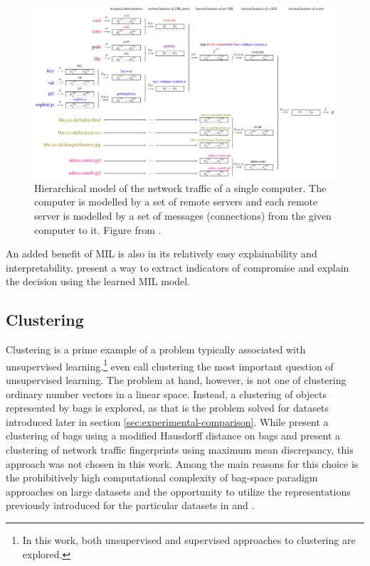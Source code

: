 \begin{figure}
	\centering
	\includegraphics[width=\textwidth]{images/HTTP-paper/HTTP-paper.pdf}
	\caption{Hierarchical model of the network traffic of a single computer. The computer is modelled by a set of remote servers and each remote server is modelled by a set of messages (connections) from the given computer to it. Figure from \cite{pevny_nested_2020}.}\label{fig:HTTP-paper}
\end{figure}

An added benefit of MIL is also in its relatively easy explainability and interpretability. \cite{pevny_nested_2020} present a way to extract indicators of compromise and explain the decision using the learned MIL model.

\subsection{Clustering}

Clustering is a prime example of a problem typically associated with unsupervised learning.\footnote{In this work, both unsupervised and supervised approaches to clustering are explored.} \cite{xu_comprehensive_2015} even call clustering the most important question of unsupervised learning. The problem at hand, however, is not one of clustering ordinary number vectors in a linear space. Instead, a clustering of objects represented by bags is explored, as that is the problem solved for datasets introduced later in section \ref{sec:experimental-comparison}. While \cite{wang_solving_2000} present a clustering of bags using a modified Hausdorff distance on bags and \cite{kohout_network_2018} present a clustering of network traffic fingerprints using maximum mean discrepancy, this approach was not chosen in this work. Among the main reasons for this choice is the prohibitively high computational complexity of bag-space paradigm approaches on large datasets and the opportunity to utilize the representations previously introduced for the particular datasets in \cite{dedic_hierarchicke_2017} and \cite{pevny_nested_2020}.

